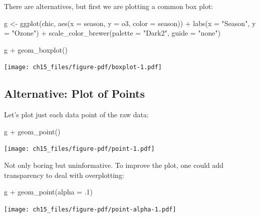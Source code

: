 \documentclass[
  letterpaper,
  DIV=11,
  numbers=noendperiod]{scrreprt}
\newenvironment{Shaded}{\begin{snugshade}}{\end{snugshade}}
\newcommand{\AttributeTok}[1]{\textcolor[rgb]{0.40,0.45,0.13}{#1}}
\newcommand{\DecValTok}[1]{\textcolor[rgb]{0.68,0.00,0.00}{#1}}
\newcommand{\FunctionTok}[1]{\textcolor[rgb]{0.28,0.35,0.67}{#1}}
\newcommand{\NormalTok}[1]{\textcolor[rgb]{0.00,0.23,0.31}{#1}}
\newcommand{\OtherTok}[1]{\textcolor[rgb]{0.00,0.23,0.31}{#1}}
\newcommand{\SpecialCharTok}[1]{\textcolor[rgb]{0.37,0.37,0.37}{#1}}
\newcommand{\StringTok}[1]{\textcolor[rgb]{0.13,0.47,0.30}{#1}}
\begin{document}
There are alternatives, but first we are plotting a common box plot:

\begin{Shaded}
\begin{Highlighting}[]
\NormalTok{g }\OtherTok{\textless{}{-}}
  \FunctionTok{ggplot}\NormalTok{(chic, }\FunctionTok{aes}\NormalTok{(}\AttributeTok{x =}\NormalTok{ season, }\AttributeTok{y =}\NormalTok{ o3,}
                   \AttributeTok{color =}\NormalTok{ season)) }\SpecialCharTok{+}
    \FunctionTok{labs}\NormalTok{(}\AttributeTok{x =} \StringTok{"Season"}\NormalTok{, }\AttributeTok{y =} \StringTok{"Ozone"}\NormalTok{) }\SpecialCharTok{+}
    \FunctionTok{scale\_color\_brewer}\NormalTok{(}\AttributeTok{palette =} \StringTok{"Dark2"}\NormalTok{, }\AttributeTok{guide =} \StringTok{"none"}\NormalTok{)}

\NormalTok{g }\SpecialCharTok{+} \FunctionTok{geom\_boxplot}\NormalTok{()}
\end{Highlighting}
\end{Shaded}

\texttt{[image: ch15\_files/figure-pdf/boxplot-1.pdf]}

\subsection{Alternative: Plot of
Points}\label{alternative-plot-of-points}

Let's plot just each data point of the raw data:

\begin{Shaded}
\begin{Highlighting}[]
\NormalTok{g }\SpecialCharTok{+} \FunctionTok{geom\_point}\NormalTok{()}
\end{Highlighting}
\end{Shaded}

\texttt{[image: ch15\_files/figure-pdf/point-1.pdf]}

Not only boring but uninformative. To improve the plot, one could add
transparency to deal with overplotting:

\begin{Shaded}
\begin{Highlighting}[]
\NormalTok{g }\SpecialCharTok{+} \FunctionTok{geom\_point}\NormalTok{(}\AttributeTok{alpha =}\NormalTok{ .}\DecValTok{1}\NormalTok{)}
\end{Highlighting}
\end{Shaded}

\texttt{[image: ch15\_files/figure-pdf/point-alpha-1.pdf]}
\end{document}
